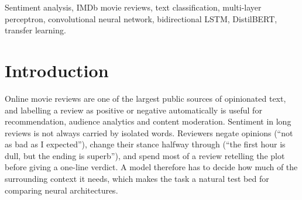 \documentclass[conference,onecolumn,a4paper,10pt]{IEEEtran}
\begin{document}
\maketitle
\thispagestyle{empty}

\begin{abstract}
Deciding whether a movie review is positive or negative requires a model to weigh word choice, negation and contrast across long, informal text. We compare four deep-learning architecture families on this task using the IMDb Large Movie Review Dataset, under one shared protocol: a 20,000/5,000 train/validation split of the official training set, a single evaluation on the untouched 25,000-review test set, and the same decision threshold and metrics for every model. The models are a multi-layer perceptron (MLP) over averaged word embeddings, a one-dimensional convolutional network (1D-CNN) with 3-, 4- and 5-word filters, a bidirectional LSTM (BiLSTM), and the pretrained Transformer DistilBERT fine-tuned end to end. DistilBERT is the most accurate model, with 90.83\% test accuracy, an F1-score of 0.907 and a ROC-AUC of 0.970. Among the models trained from scratch, the order-free MLP (88.56\%) significantly outperforms the 1D-CNN (87.32\%) and the BiLSTM (87.22\%) by McNemar's test, while training in a fraction of their time. Error analysis shows that DistilBERT's advantage is concentrated in reviews shorter than 300 words and reverses on very long reviews because of its 256-token input limit, and that reviews containing contrastive wording are the hardest case for every model. Pretraining therefore gives a clear but costly improvement, and a well-regularised bag-of-embeddings model remains a strong, inexpensive baseline.
\end{abstract}

\begin{IEEEkeywords}
Sentiment analysis, IMDb movie reviews, text classification, multi-layer perceptron, convolutional neural network, bidirectional LSTM, DistilBERT, transfer learning.
\end{IEEEkeywords}

\section{Introduction}
Online movie reviews are one of the largest public sources of opinionated text, and labelling a review as positive or negative automatically is useful for recommendation, audience analytics and content moderation. Sentiment in long reviews is not always carried by isolated words. Reviewers negate opinions (``not as bad as I expected''), change their stance halfway through (``the first hour is dull, but the ending is superb''), and spend most of a review retelling the plot before giving a one-line verdict. A model therefore has to decide how much of the surrounding context it needs, which makes the task a natural test bed for comparing neural architectures.
\end{document}
